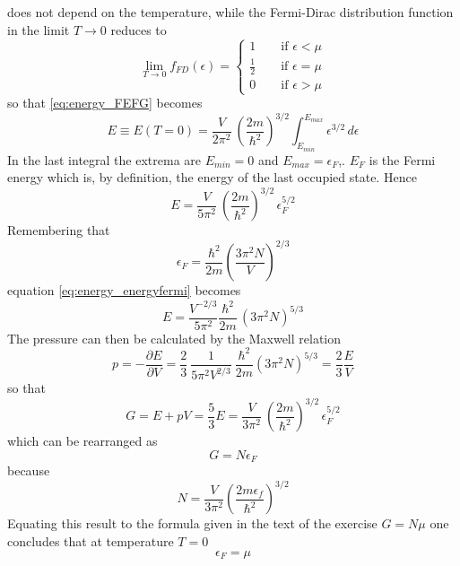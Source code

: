 \documentclass{article}
\begin{document}
does not depend on the temperature, while the Fermi-Dirac distribution function in the limit $T \to 0$ reduces to 
\begin{equation}
    \lim_{T \to 0} f_{FD}(\epsilon) = 
    \begin{cases}
        1 \qquad \text{if } \epsilon < \mu \\
        \frac{1}{2} \qquad \text{if } \epsilon = \mu \\ 
        0 \qquad \text{if } \epsilon > \mu
    \end{cases}
\end{equation}
so that \ref{eq:energy_FEFG} becomes 
\begin{equation*}
    E \equiv E(T=0) = \frac{V}{2\pi^2} \ \left(\frac{2m}{\hbar^2}\right)^{3/2} \int_{E_{min}}^{E_{max}} \epsilon^{3/2} \, d\epsilon
\end{equation*}
In the last integral the extrema are $E_{min} = 0$ and $E_{max} = \epsilon_F$,. $E_F$ is the Fermi energy which is, by definition, the energy of 
the last occupied state. Hence
\begin{equation}
    E = \frac{V}{5\pi^2} \ \left(\frac{2m}{\hbar^2}\right)^{3/2} \, \epsilon_F^{5/2}
    \label{eq:energy_energyfermi}
\end{equation}
Remembering that
\begin{equation*}
    \epsilon_F = \frac{\hbar^2}{2m} \left(\frac{3\pi^2N}{V}\right)^{2/3}
\end{equation*}
equation \ref{eq:energy_energyfermi} becomes
\begin{equation*}
    E = \frac{V^{-2/3}}{5\pi^2} \frac{\hbar^2}{2m} \, (3\pi^2N)^{5/3}
\end{equation*}
The pressure can then be calculated by the Maxwell relation 
$$p = -\frac{\partial E}{\partial V} = \frac{2}{3} \ \frac{1}{5\pi^2 V^{2/3}} \ \frac{\hbar^2}{2m} (3\pi^2N)^{5/3} = \frac{2}{3}\frac{E}{V}$$
so that 
$$G = E + pV = \frac{5}{3} E = \frac{V}{3\pi^2} \ \left(\frac{2m}{\hbar^2}\right)^{3/2} \, \epsilon_F^{5/2}$$
which can be rearranged as
$$G = N \epsilon_F$$
because 
\begin{equation*}
    N = \frac{V}{3\pi^2} \left(\frac{2m\epsilon_f}{\hbar^2}\right)^{3/2}
\end{equation*}
Equating this result to the formula given in the text of the exercise $G = N\mu$ one concludes that at temperature $T=0$ 
\begin{equation}
    \epsilon_F = \mu
\end{equation}
\end{document}
